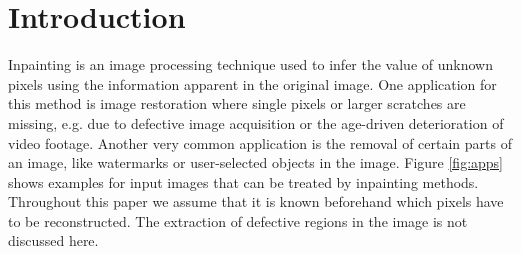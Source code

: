 \section{Introduction}
\label{sec:introduction}
Inpainting is an image processing technique used to infer the value of unknown pixels using the information apparent in the original image. One application for this method is image restoration where single pixels or larger scratches are missing, e.g. due to defective image acquisition or the age-driven deterioration of video footage. Another very common application is the removal of certain parts of an image, like watermarks or user-selected objects in the image. Figure \ref{fig:apps} shows examples for input images that can be treated by inpainting methods. Throughout this paper we assume that it is known beforehand which pixels have to be reconstructed. The extraction of defective regions in the image is not discussed here.

